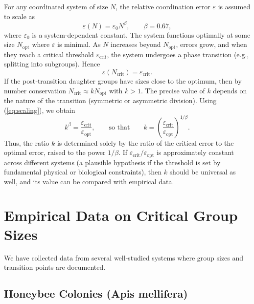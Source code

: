 \documentclass[12pt]{article}
\theoremstyle{remark}
\begin{document}
	For any coordinated system of size $N$, the relative coordination error $\varepsilon$ is assumed to scale as
	\begin{equation}
		\varepsilon(N) = \varepsilon_0 N^{\beta}, \qquad \beta = 0.67,
		\label{eq:scaling}
	\end{equation}
	where $\varepsilon_0$ is a system‑dependent constant. The system functions optimally at some size $N_{\text{opt}}$ where $\varepsilon$ is minimal. As $N$ increases beyond $N_{\text{opt}}$, errors grow, and when they reach a critical threshold $\varepsilon_{\text{crit}}$, the system undergoes a phase transition (e.g., splitting into subgroups). Hence
	\begin{equation}
		\varepsilon(N_{\text{crit}}) = \varepsilon_{\text{crit}}.
	\end{equation}
	If the post‑transition daughter groups have sizes close to the optimum, then by number conservation $N_{\text{crit}} \approx k N_{\text{opt}}$ with $k > 1$. The precise value of $k$ depends on the nature of the transition (symmetric or asymmetric division). Using (\ref{eq:scaling}), we obtain
	\begin{equation}
		k^{\beta} = \frac{\varepsilon_{\text{crit}}}{\varepsilon_{\text{opt}}}, 
		\qquad\text{so that}\qquad 
		k = \left( \frac{\varepsilon_{\text{crit}}}{\varepsilon_{\text{opt}}} \right)^{1/\beta}.
		\label{eq:k}
	\end{equation}
	Thus, the ratio $k$ is determined solely by the ratio of the critical error to the optimal error, raised to the power $1/\beta$. If $\varepsilon_{\text{crit}}/\varepsilon_{\text{opt}}$ is approximately constant across different systems (a plausible hypothesis if the threshold is set by fundamental physical or biological constraints), then $k$ should be universal as well, and its value can be compared with empirical data.
	
	\section{Empirical Data on Critical Group Sizes}
	\label{sec:data}
	
	We have collected data from several well‑studied systems where group sizes and transition points are documented.
	
	\subsection{Honeybee Colonies (Apis mellifera)}
	\label{subsec:bees}
	
\end{document}

